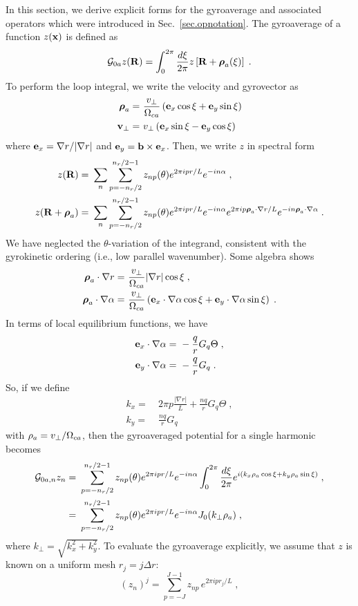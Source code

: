 In this section, we derive explicit forms for the gyroaverage
and associated operators which were introduced in 
Sec.~\ref{sec.opnotation}.  The gyroaverage of a function 
$z({\bf x})$ is defined as
%
\begin{equation}
{\cal G}_{0a} z(\mathbf{R}) = \int_0^{2\pi} \frac{d\xi}{2\pi} 
 z\left[\mathbf{R}+\boldsymbol{\rho}_a(\xi)\right] \; .
\end{equation} 
%
To perform the loop integral, we write the velocity and gyrovector as
%
\begin{align}
\boldsymbol{\rho}_a = &~\frac{v_\perp}{\Omega_{ca}} \left( \mathbf{e}_x \cos\xi 
+ \mathbf{e}_y \sin\xi \right) \\
\mathbf{v}_\perp = &~v_\perp \left( \mathbf{e}_x \sin\xi
- \mathbf{e}_y \cos\xi \right) 
\end{align}
%
where $\mathbf{e}_x = \nabla r/|\nabla r|$ and $\mathbf{e}_y = \mathbf{b} \times \mathbf{e}_x$.
Then, we write $z$ in spectral form
%
\begin{align}
z(\mathbf{R}) = &~\sum_n \sum_{p=-n_r/2}^{n_r/2-1} z_{np}(\theta) 
 e^{2 \pi i p r/L} e^{-i n \alpha} \; , \\
z(\mathbf{R}+\boldsymbol{\rho}_a) = &~\sum_n \sum_{p=-n_r/2}^{n_r/2-1} z_{np}(\theta) 
 e^{2 \pi i p r/L} e^{-i n \alpha}
e^{2 \pi i p \boldsymbol{\rho}_a \cdot\nabla r/L} e^{-i n \boldsymbol{\rho}_a\cdot\nabla\alpha}
\; .
\end{align}
%
We have neglected the $\theta$-variation of the integrand, 
consistent with the gyrokinetic ordering (i.e., low parallel 
wavenumber).   Some algebra shows
%
\begin{align}
\boldsymbol{\rho}_a \cdot \nabla r = &~\frac{v_\perp}{\Omega_{ca}} |\nabla r| 
 \cos\xi \; , \\
\boldsymbol{\rho}_a \cdot \nabla\alpha = &~\frac{v_\perp}{\Omega_{ca}} 
\left( \mathbf{e}_x \cdot \nabla\alpha \cos\xi + 
 \mathbf{e}_y\cdot\nabla\alpha\sin\xi \right) \; .
\end{align}
%
In terms of local equilibrium functions, we have 
%
\begin{align}
\mathbf{e}_x\cdot\nabla\alpha = &~-\frac{q}{r} G_q \Theta \; , \\
\mathbf{e}_y\cdot\nabla\alpha = &~-\frac{q}{r} G_q \; . 
\end{align}
%
So, if we define 
%
\begin{align}
k_x = &~2\pi p \frac{|\nabla r|}{L} + \frac{nq}{r} G_q\Theta \; , \\
k_y = &~\frac{nq}{r} G_q
\end{align}
%
with $\rho_a = v_\perp/\Omega_{ca}$, then the gyroaveraged potential 
for a single harmonic becomes
%
\begin{align}
{\cal G}_{0a,n} z_n = &~\sum_{p=-n_r/2}^{n_r/2-1} z_{np}(\theta) 
 e^{2 \pi i p r/L} e^{-i n \alpha} 
 \int_0^{2\pi} \frac{d\xi}{2\pi} 
 e^{i ( k_x \rho_a \cos\xi + k_y \rho_a \sin\xi )} \; , \\
   = &~\sum_{p=-n_r/2}^{n_r/2-1} z_{np}(\theta) 
 e^{2 \pi i p r/L} e^{-i n \alpha}  
J_0(k_\perp \rho_a) \; ,
\end{align} 
%
where $k_\perp = \sqrt{k_x^2+k_y^2}$.  To evaluate the gyroaverage 
explicitly, we assume that $z$ is known on a uniform mesh 
$r_j = j \Delta r$:
%
\begin{equation}
(z_n)^j = \sum_{p=-J}^{J-1} z_{np} \, e^{2 \pi i p r_j/L} \; ,
\end{equation}

